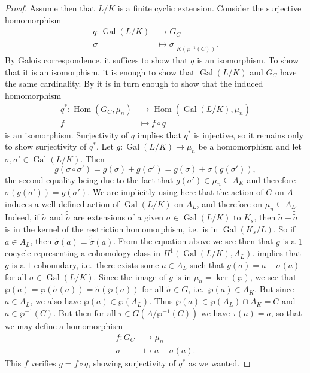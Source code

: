 \documentclass[12pt]{amsart}
\DeclareMathOperator{\Hom}{Hom}
\DeclareMathOperator{\Gal}{Gal}
\begin{document}
\begin{thm}
\begin{proof}
	Assume then that $L/K$ is a finite cyclic extension.
	Consider the surjective homomorphism
	\begin{align*}
	    q\colon \Gal(L/K) & \longrightarrow G_{C} \\
	    \sigma & \longmapsto \sigma|_{K(\wp^{-1}(C))}.
	\end{align*}
	By Galois correspondence, it suffices to show that $q$ is an isomorphism.
	To show that it is an isomorphism, it is enough to show that $\Gal(L/K)$ and $G_{C}$ have the same cardinality.
	By  it is in turn enough to show that the induced homomorphism
	\begin{align*}
	    q^{*}\colon \Hom(G_{C},\mu_{n}) & \longrightarrow \Hom(\Gal(L/K),\mu_{n}) \\
	    f & \longmapsto f\circ q
	\end{align*}
	is an isomorphism.
	Surjectivity of $q$ implies that $q^{*}$ is injective, so it remains only to show surjectivity of $q^{*}$.
	Let $g\colon \Gal(L/K)\to \mu_{n}$ be a homomorphism and let $\sigma,\sigma'\in \Gal(L/K)$.
	Then
	\[ g(\sigma\circ \sigma')=g(\sigma)+g(\sigma')=g(\sigma)+\sigma(g(\sigma')), \]
	the second equality being due to the fact that $g(\sigma')\in \mu_{n}\subseteq A_{K}$ and therefore $\sigma(g(\sigma'))=g(\sigma')$.
	We are implicitly using here that the action of $G$ on $A$ induces a well-defined action of $\Gal(L/K)$ on $A_{L}$, and therefore on $\mu_{n}\subseteq A_{L}$.
	Indeed, if $\tilde{\sigma}$ and $\tilde{\tilde{\sigma}}$ are extensions of a given $\sigma\in \Gal(L/K)$ to $K_{s}$, then $\tilde{\sigma}-\tilde{\tilde{\sigma}}$ is in the kernel of the restriction homomorphism, i.e.~is in $\Gal(K_{s}/L)$.
	So if $a\in A_{L}$, then $\tilde{\sigma}(a)=\tilde{\tilde{\sigma}}(a)$.
	From the equation above we see then that $g$ is a $1$-cocycle representing a cohomology class in $H^{1}(\Gal(L/K),A_{L})$.
	 implies that $g$ is a $1$-coboundary, i.e.~there exists some $a\in A_{L}$ such that $g(\sigma)=a-\sigma(a)$ for all $\sigma\in \Gal(L/K)$.
	Since the image of $g$ is in $\mu_{n}=\ker(\wp)$, we see that $\wp(a)=\wp(\tilde{\sigma}(a))=\tilde{\sigma}(\wp(a))$ for all $\tilde{\sigma} \in G$, i.e.~$\wp(a)\in A_{K}$.
	But since $a\in A_{L}$, we also have $\wp(a)\in \wp(A_{L})$.
	Thus $\wp(a)\in \wp(A_{L})\cap A_{K}=C$ and $a\in \wp^{-1}(C)$.
	But then for all $\tau\in G(A/\wp^{-1}(C))$ we have $\tau(a)=a$, so that we may define a homomorphism
	\begin{align*}
	    f\colon G_{C} & \longrightarrow \mu_{n} \\
	    \sigma & \longmapsto a-\sigma(a).
	\end{align*}
	This $f$ verifies $g=f\circ q$, showing surjectivity of $q^{*}$ as we wanted.
    \end{proof}
\end{thm}
\end{document}
